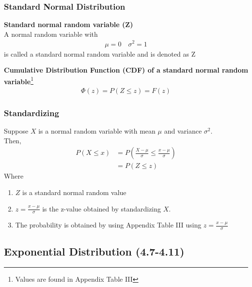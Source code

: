 \documentclass[../INDE315.tex]{subfiles}
\begin{document}
\subsubsection*{\textbf{Standard} Normal Distribution}
\begin{defn}
    \textbf{Standard normal random variable (Z)} \\
    A normal random variable with
    \begin{equation*}
        \begin{aligned}
            \mu  = 0 \quad \sigma ^2 = 1
        \end{aligned}
    \end{equation*}
    is called a standard normal random variable and is denoted as Z
\end{defn}

\begin{defn}
    \textbf{Cumulative Distribution Function (CDF) of a standard normal random variable}\footnote{Values are found in Appendix Table III} \\
    \begin{equation*}
        \begin{aligned}
            \Phi (z) = P(Z \leq z) = F(z)
        \end{aligned}
    \end{equation*}
\end{defn}

\subsubsection*{Standardizing}
Suppose $X$ is a normal random variable with mean $\mu$ and variance $\sigma^2$. \\
Then, 
\begin{equation*}
    \begin{aligned}
        P(X \leq x) &= P(\frac{X - \mu}{\sigma} \leq \frac{x - \mu}{\sigma}) \\
                &= P(Z \leq z)
    \end{aligned}
\end{equation*}
Where 
\begin{enumerate}
    \item $Z$ is a standard normal random value
    \item $z = \frac{x - \mu}{\sigma}$ is the z-value obtained by standardizing $X$.
    \item The probability is obtained by using Appendix Table III using $z = \frac{x - \mu}{\sigma}$
\end{enumerate}
\subsection*{Exponential Distribution (4.7-4.11)}
\end{document}

